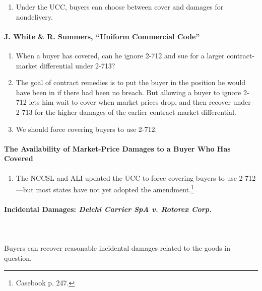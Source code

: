 \begin{enumerate}
    \item Under the UCC, buyers can choose between cover and damages for 
    nondelivery.
\end{enumerate}

\paragraph{J. White \& R. Summers, ``Uniform Commercial Code''}

\begin{enumerate}
    \item When a buyer has covered, can he ignore 2-712 and sue for a larger 
    contract-market differential under 2-713?
    \item The goal of contract remedies is to put the buyer in the position he 
    would have been in if there had been no breach. But allowing a buyer to 
    ignore 2-712 lets him wait to cover when market prices drop, and then 
    recover under 2-713 for the higher damages of the earlier contract-market 
    differential.
    \item We should force covering buyers to use 2-712.
\end{enumerate}

\paragraph{The Availability of Market-Price Damages to a Buyer Who Has Covered}

\begin{enumerate}
    \item The NCCSL and ALI updated the UCC to force covering buyers to use 
    2-712---but most states have not yet adopted the 
    amendment.\footnote{Casebook p. 247.}
\end{enumerate}

\paragraph{Incidental Damages: \emph{Delchi Carrier SpA v. Rotorex Corp.}}
~\\\\
Buyers can recover reasonable incidental damages related to the goods in 
question.

